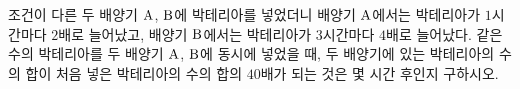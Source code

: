 조건이 다른 두 배양기 $\mathrm{A}$, $\mathrm{B}$에 박테리아를 넣었더니 배양기 $\mathrm{A}$에서는 박테리아가 $1$시간마다 $2$배로 늘어났고, 배양기 $\mathrm{B}$에서는 박테리아가 $3$시간마다 $4$배로 늘어났다. 같은 수의 박테리아를 두 배양기 $\mathrm{A}$, $\mathrm{B}$에 동시에 넣었을 때, 두 배양기에 있는 박테리아의 수의 합이 처음 넣은 박테리아의 수의 합의 $40$배가 되는 것은 몇 시간 후인지 구하시오.
